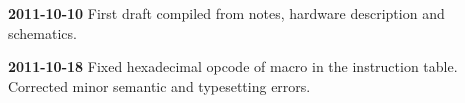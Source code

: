 





    

    
  

  {\bfseries 2011-10-10} First draft compiled from notes, hardware description
  and schematics.

  {\bfseries 2011-10-18} Fixed hexadecimal opcode of macro  in the
  instruction table. Corrected minor semantic and typesetting errors.
  
